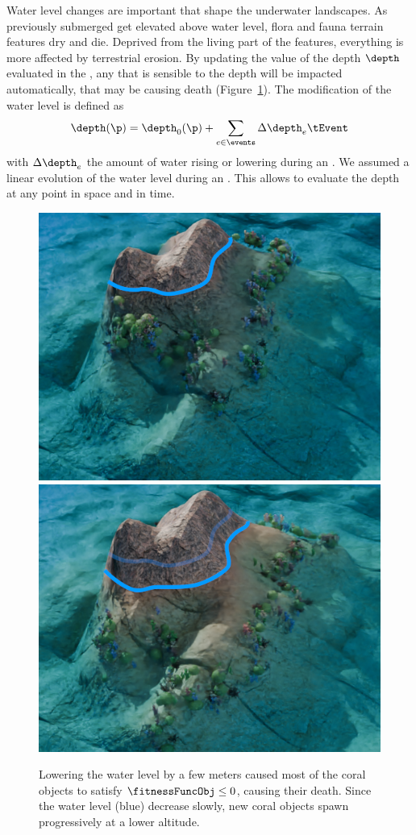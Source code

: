 Water level changes are important  that shape the underwater landscapes. As previously submerged  get elevated above water level, flora and fauna terrain features dry and die. Deprived from the living part of the features, everything is more affected by terrestrial erosion. By updating the value of the depth $\depth$ evaluated in the , any  that is sensible to the depth will be impacted automatically, that may be causing death (Figure~\ref{fig:semantic-representation_water-event}). The modification of the water level is defined as 
\begin{align*}
    \depth(\p) = \depth_0(\p) + \sum_{e \in \events} \Delta \depth_e \tEvent
\end{align*}
with $\Delta \depth_e$ the amount of water rising or lowering during an . We assumed a linear evolution of the water level during an . This allows to evaluate the depth at any point in space and in time.

\begin{figure}
    \includegraphics[width = 0.45 \linewidth]{Figures/Interactions/InteractionWater1.png}
    \includegraphics[width = 0.45 \linewidth]{Figures/Interactions/InteractionWater3.png}
    \caption{Lowering the water level by a few meters caused most of the coral objects to satisfy $\fitnessFuncObj \leq 0$, causing their death. Since the water level (blue) decrease slowly, new coral objects spawn progressively at a lower altitude.}
    \label{fig:semantic-representation_water-event}
\end{figure}

